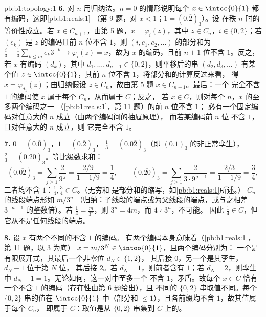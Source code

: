 \begin{solution}{pb:b1:topology:1}
\textbf{6.} 对 $n$ 用归纳法。$n = 0$ 的情形说明每个 $x \in
\intcc{0}{1}$ 都有编码，这即\cref{pb:b1:reals:1}
（第 9 题，对 $x < 1$；$1 = (0.\overline 2)_3$）。设
在秩 $n$ 时的等价性成立。若 $x \in C_{n+1}$，由第 5 题，$x =
\varphi_i(z)$，其中 $z \in C_n$，$i \in \{0, 2\}$；若 $(e_k)$
是 $z$ 的编码且前 $n$ 位不含 $1$，则 $(i, e_1,
e_2, \dots)$ 的部分和为 $\frac i3 + \frac13\sum_{k\leq m}
e_k 3^{-k} \to \varphi_i(z) = x$，故为 $x$ 的编码，且前 $n +
1$ 位不含 $1$。反之，若 $x$ 有编码 $(d_k)$，其中
$d_1, \dots, d_{n+1} \in \{0, 2\}$，则平移后的串 $(d_2,
d_3, \dots)$ 有某个值 $z \in \intcc{0}{1}$，其前 $n$
位不含 $1$，将部分和的计算反过来看，
得 $x = \varphi_{d_1}(z)$；由归纳假设 $z \in
C_n$，故由第 5 题 $x \in C_{n+1}$。最后：一个
完全不含 $1$ 的编码使 $x$ 属于每个 $C_n$，从而属于 $C$；反之，
若 $x \in C$，则对每个 $n$，$x$ 的至多两个编码之一
（\cref{pb:b1:reals:1}，第 11 题）的前 $n$ 位不含 $1$；
必有一个固定编码对任意大的 $n$ 成立（由两个编码间的抽屉原理），
而若某编码前 $n$ 位
不含 $1$，且对任意大的 $n$ 成立，则
它完全不含 $1$。

\textbf{7.} $0 = (0.\overline 0)_3$，$1 = (0.\overline 2)_3$，
$\frac13 = (0.0\overline{2})_3$（即 $(0.1)_3$ 的非正常孪生），
$\frac23 = (0.2\overline{0})_3$。等比级数求和：
\[
(0.\overline{02})_3 = \sum_{j\geq1} \frac{2}{9^{\,j}}
= \frac{2/9}{1 - 1/9} = \frac14 ,
\qquad
(0.\overline{20})_3 = \sum_{j\geq1} \frac{2}{3\cdot 9^{\,j-1}}
= \frac{2/3}{1 - 1/9} = \frac34 ,
\]
二者均不含 $1$：$\frac14, \frac34 \in C$。（无穷和
是部分和的缩写，如\cref{pb:b1:reals:1}所述。）
$C_n$ 的线段端点形如 $m/3^n$
（归纳：子线段的端点或为父线段的端点，或与之相差
$3^{-n-1}$ 的整数倍）。若 $\frac14 =
\frac{m}{3^n}$，则 $3^n = 4m$，而 $4 \nmid 3^n$，不可能。
因此 $\frac14 \in C$，但它从不是任何线段的端点。

\textbf{8.} 设 $x$ 有两个不同的不含 $1$ 的编码。
有两个编码本身意味着（\cref{pb:b1:reals:1}，第 11 题，以 $3$ 为底）
$x = m/3^N \in \intoo{0}{1}$，且两个编码分别为：
一个是有限展开式，其最后一个非零位 $d_N \in \{1, 2\}$，
其后接 $0$，另一个是其孪生，$d_N - 1$ 位于第 $N$ 位，
其后接 $2$。若 $d_N = 1$，则前者含有 $1$；若 $d_N
= 2$，则孪生中 $d_N - 1 = 1$。无论如何，这一对中至多一个
不含 $1$，矛盾。故每个 $x \in C$ 恰有
一个不含 $1$ 的编码（存在性由第 6 题给出），且
不同的 $\{0,2\}$ 串取值不同。每个
$\{0,2\}$ 串的值在 $\intcc{0}{1}$ 中（部分和 $\leq
1$），且各前缀均不含 $1$，故其值属于每个 $C_n$，
即属于 $C$：取值是从
$\{0,2\}$ 串集到 $C$ 上的。


\end{solution}
